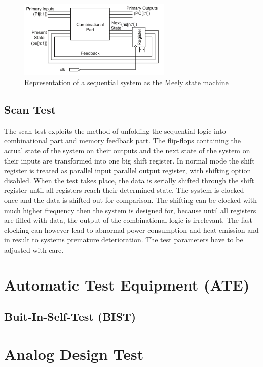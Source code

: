 \begin{figure}[H]
\centering
\includegraphics[width=0.65\textwidth]{figures/Meely.PNG}
\caption{Representation of a sequential system as the Meely state machine}
\label{fig:Meely}
\end{figure}

\subsection{Scan Test}
The scan test exploits the method of unfolding the sequential logic into combinational part and memory feedback part. The flip-flops containing the actual state of the system on their outputs and the next state of the system on their inputs are transformed into one big shift register. In normal mode the shift register is treated as parallel input parallel output register, with shifting option disabled. When the test takes place, the data is serially shifted through the shift register until all registers reach their determined state. The system is clocked once and the data is shifted out for comparison. The shifting can be clocked with much higher frequency then the system is designed for, because until all registers are filled with data, the output of the combinational logic is irrelevant. The fast clocking can however lead to abnormal power consumption and heat emission and in result to systems premature deterioration. The test parameters have to be adjusted with care.

\section{Automatic Test Equipment (ATE)}

\subsection{Buit-In-Self-Test (BIST)}
\section{Analog Design Test}




